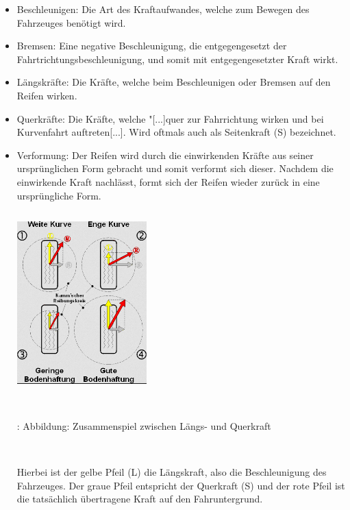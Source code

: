 \documentclass{article}
\begin{document}
				\begin{itemize}
					\item Beschleunigen: Die Art des Kraftaufwandes, welche zum Bewegen des Fahrzeuges benötigt wird.
					\item Bremsen: Eine negative Beschleunigung, die entgegengesetzt der Fahrtrichtungsbeschleunigung, und somit mit entgegengesetzter Kraft wirkt.
					\item Längskräfte: Die Kräfte, welche beim Beschleunigen oder Bremsen auf den Reifen wirken.
					\item Querkräfte: Die Kräfte, welche "[...]quer zur Fahrrichtung wirken und bei Kurvenfahrt auftreten[...].\cite{TS18} Wird oftmals auch als Seitenkraft (S) bezeichnet.
					\item Verformung: Der Reifen wird durch die einwirkenden Kräfte aus seiner ursprünglichen Form gebracht und somit verformt sich dieser. Nachdem die einwirkende Kraft nachlässt, formt sich der Reifen wieder zurück in eine ursprüngliche Form.
					
					\begin{center}
						\includegraphics[width=5cm, height=7cm] {Images/Kapitel5/l_qkraft.png}
						\caption {\\\cite{TS19}: Abbildung: Zusammenspiel zwischen Längs- und Querkraft}
					\end{center}\\
					
					\begin{flushleft}
						Hierbei ist der gelbe Pfeil (L) die Längskraft, also die Beschleunigung des Fahrzeuges.
						Der graue Pfeil entspricht der Querkraft (S) und der rote Pfeil ist die tatsächlich übertragene Kraft auf den Fahruntergrund.\\
					\end{flushleft}
					  
				\end{itemize}
			
\end{document}
